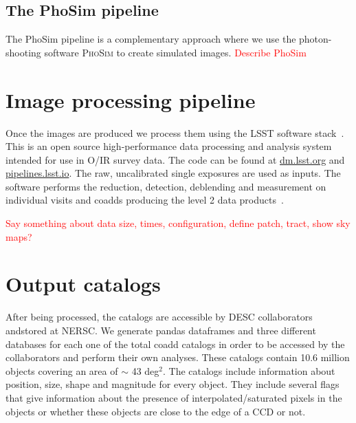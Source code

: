 \documentclass[\docopts]{\docclass}
\begin{document}

\subsection{The PhoSim pipeline}
\label{sec:phosim_pipeline}

The PhoSim pipeline is a complementary approach where we use the photon-shooting software \textsc{PhoSim} to create simulated images.
\textcolor{red}{Describe PhoSim}

\section{Image processing pipeline}
\label{sec:image_processing_pipeline}

Once the images are produced we process them using the LSST software stack~\citep{2015arXiv151207914J}. This is an open
source high-performance data processing and analysis system intended for use in O/IR survey data. The code can be found at
\url{dm.lsst.org} and \url{pipelines.lsst.io}. The raw, uncalibrated single exposures are used as inputs. The software performs
the reduction, detection, deblending and measurement on individual visits and coadds producing the level 2 data
products~\citep{2015arXiv151207914J}.

\textcolor{red}{Say something about data size, times, configuration, define patch, tract, show sky maps?}

\section{Output catalogs}
\label{sec:catalogs}

After being processed, the catalogs are accessible by DESC collaborators andstored at NERSC. We generate pandas
dataframes and three different databases for each one of the total coadd catalogs in order to be accessed by the
collaborators and perform their own analyses. These catalogs contain 10.6 million objects covering an area
of $\sim$ 43 deg$^{2}$. The catalogs include information about position, size, shape and magnitude for every object.
They include several flags that give information about the presence of interpolated/saturated pixels in the objects
or whether these objects are close to the edge of a CCD or not.
\end{document}
